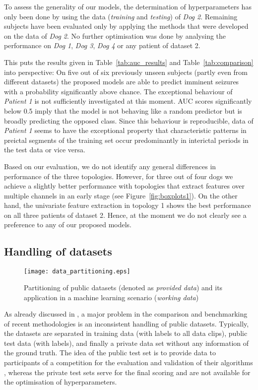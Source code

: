 \documentclass[a4paper, conference]{IEEEtran}
\begin{document}
To assess the generality of our models, the determination of hyperparameters has only been done by using the data (\textit{training} and \textit{testing}) of \textit{Dog 2}. Remaining subjects have been evaluated only by applying the methods that were developed on the data of \textit{Dog 2}. No further optimisation was done by analysing the performance on \textit{Dog 1}, \textit{Dog 3}, \textit{Dog 4} or any patient of dataset 2.

This puts the results given in Table~\ref{tab:auc_results} and Table~\ref{tab:comparison} into perspective: On five out of six previously unseen subjects (partly even from different datasets) the proposed models are able to predict imminent seizures with a probability significantly above chance. The exceptional behaviour of \textit{Patient 1} is not sufficiently investigated at this moment. AUC scores significantly below 0.5 imply that the model is not behaving like a random predictor but is broadly predicting the opposed class. Since this behaviour is reproducible, data of \textit{Patient 1} seems to have the exceptional property that characteristic patterns in preictal segments of the training set  occur predominantly in interictal periods in the test data or vice versa.

Based on our evaluation, we do not identify any general differences in performance of the three topologies. However, for three out of four dogs we achieve a slightly better performance with topologies that extract features over multiple channels in an early stage (see Figure~\ref{fig:boxplots1}). On the other hand, the univariate feature extraction in topology 1 shows the best performance on all three patients of dataset 2. Hence, at the moment we do not clearly see a  preference to any of our proposed models.


\subsection{Handling of datasets}
\label{subsec:handling_of_datasets}

\begin{figure}[t]
	\centering
	\texttt{[image: data\_partitioning.eps]}
	\caption{Partitioning of public datasets (denoted as \textit{provided data}) and its application in a machine learning scenario (\textit{working data})}
	\label{fig:data_partitioning}
\end{figure}

As already discussed in \cite{Korshunova2018}, a major problem in the comparison and benchmarking of recent methodologies is an inconsistent handling of public datasets. Typically, the datasets are separated in training data (with labels to all data clips), public test data (with labels), and finally a private data set without any information of the ground truth. The idea of the public test set is to provide data to participants of a competition for the evaluation and validation of their algorithms \cite{Brinkmann2016, Kuhlmann2018}, whereas the private test sets serve for the final scoring and are not available for the optimisation of hyperparameters.
\end{document}
